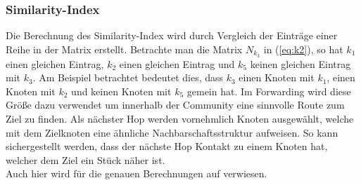\documentclass[a4paper, 12pt]{article}
\begin{document}

\subsubsection{Similarity-Index}
Die Berechnung des Similarity-Index wird durch Vergleich der Einträge einer Reihe in der Matrix erstellt.
Betrachte man die Matrix $N_{k_3}$ in (\ref{eq:k2}), so hat $k_1$ einen gleichen Eintrag, $k_2$ einen gleichen Eintrag und $k_5$ keinen gleichen Eintrag mit $k_3$. Am Beispiel betrachtet bedeutet dies, dass $k_3$ einen Knoten mit $k_1$, einen Knoten mit $k_2$ und keinen Knoten mit $k_5$ gemein hat.
Im Forwarding wird diese Größe dazu verwendet um innerhalb der Community eine sinnvolle Route zum Ziel zu finden. Als nächster Hop werden vornehmlich Knoten ausgewählt, welche mit dem Zielknoten eine ähnliche Nachbarschaftsstruktur aufweisen. So kann sichergestellt werden, dass der nächste Hop Kontakt zu einem Knoten hat, welcher dem Ziel ein Stück näher ist.\\
Auch hier wird für die genauen Berechnungen auf \cite[p.~35f]{daly2007social} verwiesen.
\end{document}
